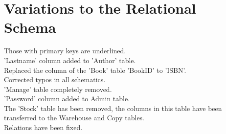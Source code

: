 \documentclass{article}
\begin{document}
\section {Variations to the Relational Schema}
Those with primary keys are underlined.\\
'Lastname' column added to 'Author' table.\\
Replaced the column of the 'Book' table 'BookID' to 'ISBN'.\\
Corrected typos in all schematics.\\
'Manage' table completely removed.\\
'Password' column added to Admin table.\\
The 'Stock' table has been removed, the columns in this table have been \\ transferred to the Warehouse and Copy tables.\\
Relations have been fixed.\\
\end{document}
